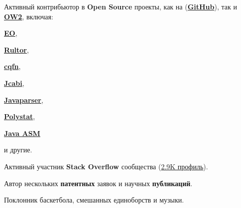 \documentclass{vl}
\begin{document}
    Активный контрибьютор в \textbf{Open Source} проекты, как
    на (\textbf{\href{https://github.com/volodya-lombrozo}{GitHub}}),
    так и \textbf{\href{https://gitlab.ow2.org/lombrozo}{OW2}}, включая:
    \begin{inparaenum}[1)]
        \item \textbf{\href{https://www.eolang.org}{EO}},
        \item \textbf{\href{https://github.com/yegor256/rultor}{Rultor}},
        \item \textbf{\href{https://github.com/cqfn}{cqfn}},
        \item \textbf{\href{https://github.com/jcabi}{Jcabi}},
        \item \textbf{\href{https://github.com/javaparser/javaparser}{Javaparser}},
        \item \textbf{\href{https://github.com/polystat}{Polystat}},
        \item \textbf{\href{https://gitlab.ow2.org/asm/asm}{Java ASM}}
        \item и другие.
    \end{inparaenum}

    Активный участник \textbf{Stack Overflow} сообщества
    (\href{https://stackoverflow.com/users/10423604/volodya-lombrozo}{2.9K профиль}).

    Автор нескольких \textbf{патентных} заявок и научных \textbf{публикаций}.

    Поклонник баскетбола, смешанных единоборств и музыки.
\end{document}
